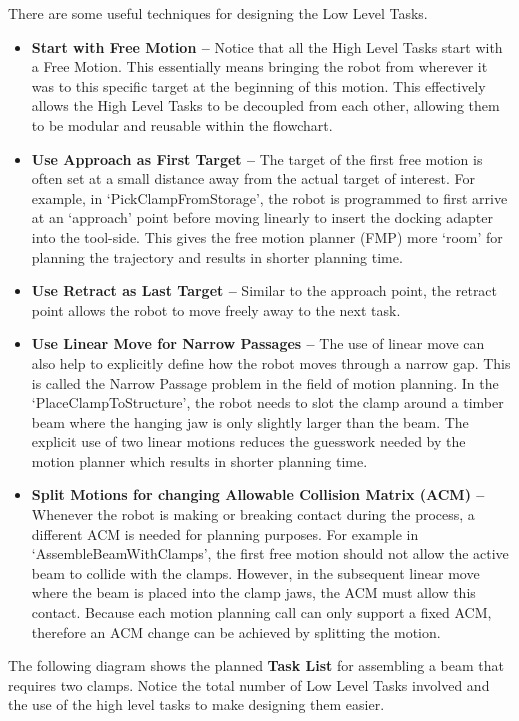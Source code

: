 









There are some useful techniques for designing the Low Level Tasks. 

\begin{itemize}
	\item \textbf{Start with Free Motion --} Notice that all the High Level Tasks start with a Free Motion. This essentially means bringing the robot from wherever it was to this specific target at the beginning of this motion. This effectively allows the High Level Tasks to be decoupled from each other, allowing them to be modular and reusable within the flowchart.

	\item \textbf{Use Approach as First Target --} The target of the first free motion is often set at a small distance away from the actual target of interest. For example, in ‘PickClampFromStorage’, the robot is programmed to first arrive at an ‘approach’ point before moving linearly to insert the docking adapter into the tool-side. This gives the free motion planner (FMP) more ‘room’ for planning the trajectory and results in shorter planning time.

	\item \textbf{Use Retract as Last Target --} Similar to the approach point, the retract point allows the robot to move freely away to the next task.

	\item \textbf{Use Linear Move for Narrow Passages --} The use of linear move can also help to explicitly define how the robot moves through a narrow gap. This is called the Narrow Passage problem in the field of motion planning. In the ‘PlaceClampToStructure’, the robot needs to slot the clamp around a timber beam where the hanging jaw is only slightly larger than the beam. The explicit use of two linear motions reduces the guesswork needed by the motion planner which results in shorter planning time.

	\item \textbf{Split Motions for changing Allowable Collision Matrix (ACM) --} Whenever the robot is making or breaking contact during the process, a different ACM is needed for planning purposes. For example in ‘AssembleBeamWithClamps’, the first free motion should not allow the active beam to collide with the clamps. However, in the subsequent linear move where the beam is placed into the clamp jaws, the ACM must allow this contact. Because each motion planning call can only support a fixed ACM, therefore an ACM change can be achieved by splitting the motion.

\end{itemize}
The following diagram shows the planned \textbf{Task List} for assembling a beam that requires two clamps. Notice the total number of Low Level Tasks involved and the use of the high level tasks to make designing them easier.

